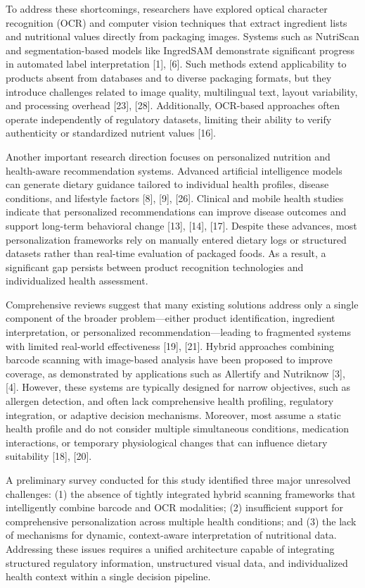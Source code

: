 \documentclass[conference]{IEEEtran}
\begin{document}
To address these shortcomings, researchers have explored optical character recognition (OCR) and computer vision techniques that extract ingredient lists and nutritional values directly from packaging images. Systems such as NutriScan and segmentation-based models like IngredSAM demonstrate significant progress in automated label interpretation [1], [6]. Such methods extend applicability to products absent from databases and to diverse packaging formats, but they introduce challenges related to image quality, multilingual text, layout variability, and processing overhead [23], [28]. Additionally, OCR-based approaches often operate independently of regulatory datasets, limiting their ability to verify authenticity or standardized nutrient values [16].

Another important research direction focuses on personalized nutrition and health-aware recommendation systems. Advanced artificial intelligence models can generate dietary guidance tailored to individual health profiles, disease conditions, and lifestyle factors [8], [9], [26]. Clinical and mobile health studies indicate that personalized recommendations can improve disease outcomes and support long-term behavioral change [13], [14], [17]. Despite these advances, most personalization frameworks rely on manually entered dietary logs or structured datasets rather than real-time evaluation of packaged foods. As a result, a significant gap persists between product recognition technologies and individualized health assessment.

Comprehensive reviews suggest that many existing solutions address only a single component of the broader problem—either product identification, ingredient interpretation, or personalized recommendation—leading to fragmented systems with limited real-world effectiveness [19], [21]. Hybrid approaches combining barcode scanning with image-based analysis have been proposed to improve coverage, as demonstrated by applications such as Allertify and Nutriknow [3], [4]. However, these systems are typically designed for narrow objectives, such as allergen detection, and often lack comprehensive health profiling, regulatory integration, or adaptive decision mechanisms. Moreover, most assume a static health profile and do not consider multiple simultaneous conditions, medication interactions, or temporary physiological changes that can influence dietary suitability [18], [20].

A preliminary survey conducted for this study identified three major unresolved challenges:
(1) the absence of tightly integrated hybrid scanning frameworks that intelligently combine barcode and OCR modalities;
(2) insufficient support for comprehensive personalization across multiple health conditions; and
(3) the lack of mechanisms for dynamic, context-aware interpretation of nutritional data.
Addressing these issues requires a unified architecture capable of integrating structured regulatory information, unstructured visual data, and individualized health context within a single decision pipeline.
\end{document}
